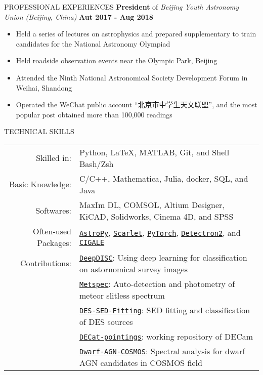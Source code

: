 \documentclass[10pt]{article} %
\begin{document}
\begin{section}{PROFESSIONAL EXPERIENCES}
\textbf{President} of \textit{Beijing Youth Astronomy Union (Beijing, China)} \hfill \textbf{Aut 2017 - Aug 2018} 
\begin{itemize}[leftmargin=1.5em]
    \item Held a series of lectures on astrophysics and prepared supplementary to train candidates for the National Astronomy Olympiad
    \item Held roadside observation events near the Olympic Park, Beijing
    \item Attended the Ninth National Astronomical Society Development Forum in Weihai, Shandong
    \item Operated the WeChat public account “北京市中学生天文联盟”, and the most popular post obtained more than 100,000 readings
\end{itemize}

\end{section}

\begin{section}{TECHNICAL SKILLS}

\begin{tabular}{rl}
    Skilled in: & Python, \LaTeX, MATLAB, Git, and Shell Bash/Zsh \\
    Basic Knowledge: & C/C++, Mathematica, Julia, docker, SQL, and Java \\
    Softwares: & MaxIm DL, COMSOL, Altium Designer, KiCAD, Solidworks, Cinema 4D, and SPSS \\
    Often-used Packages: & \href{https://www.astropy.org/}{\texttt{AstroPy}}, \href{https://github.com/pmelchior/scarlet}{\texttt{Scarlet}}, \href{https://pytorch.org/}{\texttt{PyTorch}}, \href{https://github.com/facebookresearch/detectron2}{\texttt{Detectron2}}, and \href{https://cigale.lam.fr/}{\texttt{CIGALE}} \\
    Contributions: & \href{https://github.com/burke86/deepdisc}{\texttt{DeepDISC}}: Using deep learning for classification on astornomical survey images \\
    & \href{https://github.com/Chisen-Lupus/metspec}{\texttt{Metspec}}: Auto-detection and photometry of meteor slitless spectrum \\
    & \href{https://github.com/Chisen-Lupus/DES-SED-fitting}{\texttt{DES-SED-Fitting}}: SED fitting and classification of DES sources \\
    & \href{https://github.com/gnarayan/decat_pointings}{\texttt{DECat-pointings}}: working repository of DECam \\
    & \href{https://github.com/burke86/dwarf_agn_cosmos}{\texttt{Dwarf-AGN-COSMOS}}: Spectral analysis for dwarf AGN candidates in COSMOS field
\end{tabular}

\end{section} 
\end{document}
